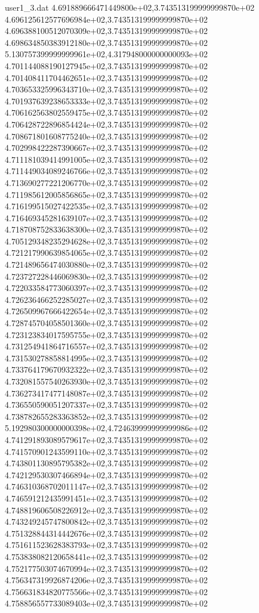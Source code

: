 \begin{filecontents}{user1_3.dat}
4.691889666471449800e+02,3.743513199999999870e+02
4.696125612577696984e+02,3.743513199999999870e+02
4.696388100512070309e+02,3.743513199999999870e+02
4.698634850383912180e+02,3.743513199999999870e+02
5.130757399999999961e+02,4.317948000000000093e+02
4.701144088190127945e+02,3.743513199999999870e+02
4.701408411704462651e+02,3.743513199999999870e+02
4.703653325996343710e+02,3.743513199999999870e+02
4.701937639238653333e+02,3.743513199999999870e+02
4.706162563802559475e+02,3.743513199999999870e+02
4.706428722896854424e+02,3.743513199999999870e+02
4.708671801608775240e+02,3.743513199999999870e+02
4.702998422287390667e+02,3.743513199999999870e+02
4.711181039414991005e+02,3.743513199999999870e+02
4.711449034089246766e+02,3.743513199999999870e+02
4.713690277221206770e+02,3.743513199999999870e+02
4.711985612005856865e+02,3.743513199999999870e+02
4.716199515027422535e+02,3.743513199999999870e+02
4.716469345281639107e+02,3.743513199999999870e+02
4.718708752833638300e+02,3.743513199999999870e+02
4.705129348235294628e+02,3.743513199999999870e+02
4.721217990639854065e+02,3.743513199999999870e+02
4.721489656474030880e+02,3.743513199999999870e+02
4.723727228446069830e+02,3.743513199999999870e+02
4.722033584773060397e+02,3.743513199999999870e+02
4.726236466252285027e+02,3.743513199999999870e+02
4.726509967666422654e+02,3.743513199999999870e+02
4.728745704058501360e+02,3.743513199999999870e+02
4.723123834017595755e+02,3.743513199999999870e+02
4.731254941864716557e+02,3.743513199999999870e+02
4.731530278858814995e+02,3.743513199999999870e+02
4.733764179670932322e+02,3.743513199999999870e+02
4.732081557540263930e+02,3.743513199999999870e+02
4.736273417477148087e+02,3.743513199999999870e+02
4.736550590051207337e+02,3.743513199999999870e+02
4.738782655283363852e+02,3.743513199999999870e+02
5.192980300000000398e+02,4.724639999999999986e+02
4.741291893089579617e+02,3.743513199999999870e+02
4.741570901243599110e+02,3.743513199999999870e+02
4.743801130895795382e+02,3.743513199999999870e+02
4.742129530307466894e+02,3.743513199999999870e+02
4.746310368702011147e+02,3.743513199999999870e+02
4.746591212435991451e+02,3.743513199999999870e+02
4.748819606508226912e+02,3.743513199999999870e+02
4.743249245747800842e+02,3.743513199999999870e+02
4.751328844314442676e+02,3.743513199999999870e+02
4.751611523628383793e+02,3.743513199999999870e+02
4.753838082120658441e+02,3.743513199999999870e+02
4.752177503074670994e+02,3.743513199999999870e+02
4.756347319926874206e+02,3.743513199999999870e+02
4.756631834820775566e+02,3.743513199999999870e+02
4.758856557733089403e+02,3.743513199999999870e+02

\end{filecontents}
